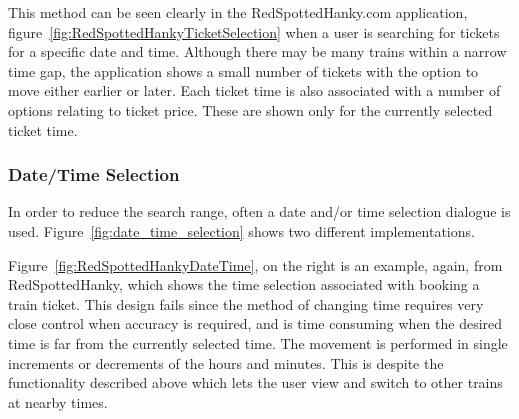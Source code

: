 This method can be seen clearly in the RedSpottedHanky.com application,
figure~\ref{fig:RedSpottedHankyTicketSelection} when a user is searching for
tickets for a specific date and time. Although there may be many trains within
a narrow time gap, the application shows a small number of tickets with the
option to move either earlier or later. Each ticket time is also associated
with a number of options relating to ticket price. These are shown only for the
currently selected ticket time.


\subsubsection{Date/Time Selection}
\label{ssub:date_time_selection}

In order to reduce the search range, often a date and/or time selection
dialogue is used. Figure~\ref{fig:date_time_selection} shows two different
implementations.

Figure~\ref{fig:RedSpottedHankyDateTime}, on the right is an example, again,
from RedSpottedHanky\cite{RedSpottedHanky}, which shows the time selection
associated with booking a train ticket. This design fails since the method of
changing time requires very close control when accuracy is required, and is
time consuming when the desired time is far from the currently selected time.
The movement is performed in single increments or decrements of the hours and
minutes. This is despite the functionality described above which lets the user
view and switch to other trains at nearby times.

